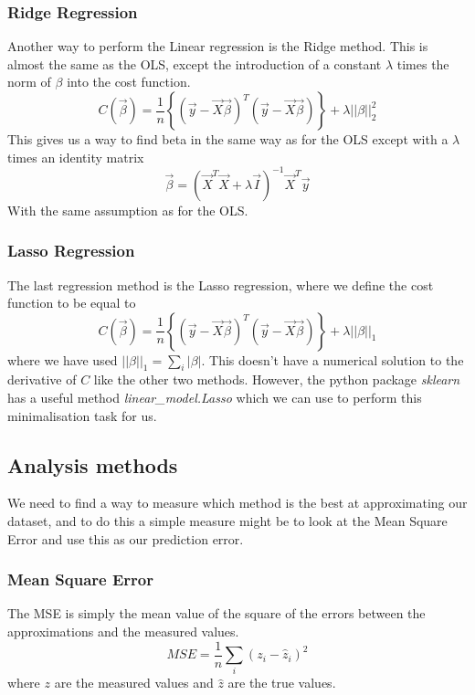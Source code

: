 \documentclass[11pt, A4paper, english]{article}
\begin{document}
\begin{multicols}{2}
			\subsubsection{Ridge Regression}
Another way to perform the Linear regression is the Ridge method. This is almost the same as the OLS, except the introduction of a constant $\lambda$ times the norm of $\beta$ into the cost function.
				\begin{equation*}
C(\vec{\beta}) =  \frac{1}{n} \left\{ \left( \vec{y} - \vec{X} \vec{\beta} \right)^{T} \left( \vec{y} - \vec{X} \vec{\beta} \right) \right\} + \lambda ||\beta||_2^2
				\end{equation*}
This gives us a way to find beta in the same way as for the OLS except with a $\lambda$ times an identity matrix
				\begin{equation}
\vec{\beta} = \left( \vec{X}^T \vec{X} + \lambda \vec{I} \right)^{-1} \vec{X}^T \vec{y}
				\end{equation}
With the same assumption as for the OLS.

			\subsubsection{Lasso Regression}
The last regression method is the Lasso regression, where we define the cost function to be equal to
				\begin{equation*}
C(\vec{\beta}) =  \frac{1}{n} \left\{ \left( \vec{y} - \vec{X} \vec{\beta} \right)^{T} \left( \vec{y} - \vec{X} \vec{\beta} \right) \right\} + \lambda ||\beta||_1
				\end{equation*}
where we have used $||\beta||_1 = \sum_{i} |\beta|$. This doesn't have a numerical solution to the derivative of $C$ like the other two methods. However, the python package \textit{sklearn} has a useful method \textit{linear\_model.Lasso} \cite{Lasso} which we can use to perform this minimalisation task for us. \\

			\subsection{Analysis methods}
We need to find a way to measure which method is the best at approximating our dataset, and to do this a simple measure might be to look at the Mean Square Error and use this as our prediction error.
				\subsubsection{Mean Square Error}
The MSE is simply the mean value of the square of the errors between the approximations and the measured values.
				\begin{equation}
MSE = \frac{1}{n} \sum_{i} \left( z_i - \hat{z}_i \right)^2
				\end{equation}
where $z$ are the measured values and $\hat{z}$ are the true values. \\

\end{multicols}
\end{document}
